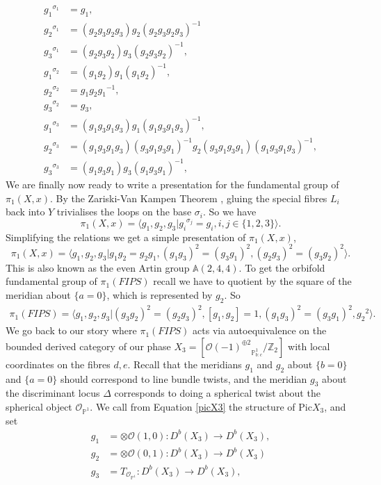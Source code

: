 \documentclass[oneside]{amsart}
\theoremstyle{definition}
\theoremstyle{definition}
\theoremstyle{definition}
\theoremstyle{definition}
\newcommand{\PP}{\mathbb{P}}
\newcommand{\A}{\mathbb{A}}
\newcommand{\Z}{\mathbb{Z}}
\newcommand{\Os}{\mathcal{O}}
\begin{document}
\begin{align*}
    {g_1}^{\sigma_1} &= g_1, \\
    {g_2}^{\sigma_1} &= (g_2 g_3 g_2 g_3) g_2 (g_2 g_3 g_2 g_3)^{-1} \\
    {g_3}^{\sigma_1} &= (g_2 g_3 g_2) g_3 (g_2 g_3 g_2)^{-1}, \\ 
    {g_1}^{\sigma_2} &= (g_1g_2) g_1 (g_1 g_2)^{-1},\\
    {g_2}^{\sigma_2} &= g_1 g_2 {g_1}^{-1},\\
    {g_3}^{\sigma_2} &= g_3, \\
    {g_1}^{\sigma_3} &= (g_1 g_3 g_1 g_3) g_1 (g_1 g_3 g_1 g_3)^{-1}, \\
    {g_2}^{\sigma_3} &= (g_1 g_3 g_1 g_3)(g_3 g_1 g_3 g_1)^{-1} g_2 (g_3 g_1 g_3 g_1)(g_1 g_3 g_1 g_3)^{-1}, \\
    {g_3}^{\sigma_3} &= (g_1 g_3 g_1)g_3 (g_1 g_3 g_1)^{-1}, 
\end{align*}
We are finally now ready to write a presentation for the fundamental group of $\pi_1(X,x)$. By the Zariski-Van Kampen Theorem \cite[Theorem 2.6 ]{cogolludo}, gluing the special fibres $L_i$ back into $Y$ trivialises the loops on the base $\sigma_i$. So we have 
$$
\pi_1(X,x) = \langle g_1, g_2, g_3 | {g_i}^{\sigma_j}=g_i, i,j \in \{1,2,3\} \rangle.
$$
Simplifying the relations we get a simple presentation of $\pi_1(X,x)$,
$$
\pi_1(X,x) = \langle g_1, g_2, g_3 | g_1g_2=g_2 g_1, (g_1 g_3)^2 = (g_3 g_1)^2 , (g_2g_3)^2= (g_3g_2)^2\rangle.
$$
This is also known as the even Artin group $\A (2,4,4)$. To get the orbifold fundamental group of $\pi_1(FIPS)$ recall we have to quotient by the square of the meridian about $\{ a=0\}$, which is represented by $g_2$. So 
\begin{align}
\pi_1(FIPS) = \langle g_1, g_2, g_3 |(g_3g_2)^2 = (g_2g_3)^2, [g_1,g_2]=1, (g_1 g_3)^2 = (g_3 g_1)^2 , {g_2}^2 \rangle.
\label{fipspresentation}
\end{align}
We go back to our story where $\pi_1(FIPS)$ acts via autoequivalence on the bounded derived category of our phase $X_3 = \left[{\mathcal{O}(-1)^{\oplus 2}}_{\PP^1_{b:c}} / \Z_2 \right]$ with local coordinates on the fibres $d,e$. Recall that the meridians $ g_1$ and $g_2$ about $\{b=0 \}$ and $\{a=0 \}$ should correspond to line bundle twists, and the meridian $ g_3 $ about the discriminant locus $\Delta$ corresponds to doing a spherical twist about the spherical object $\Os_{\PP^1}$. We call from Equation \eqref{picX3} the structure of $\text{Pic}X_3$, and set
\begin{align*}
    g_1 &= \otimes \Os(1,0) : D^b(X_3) \to D^b(X_3),\\
    g_2 &= \otimes \Os(0,1) : D^b(X_3) \to D^b(X_3)\\
    g_3 &= T_{\Os_{\PP^1}}: D^b(X_3) \to D^b(X_3),
\end{align*}
\end{document}
